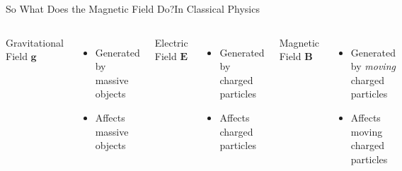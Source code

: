 \documentclass[12pt,aspectratio=169]{beamer}
\newcommand{\mb}[1]{\mathbf{#1}}
\begin{document}
\begin{frame}{So What Does the Magnetic Field Do?}{In Classical Physics}
  \begin{columns}
    \begin{center}
      Gravitational Field $\mb{g}$
    \end{center}
    \begin{itemize}
    \item Generated by massive objects
    \item Affects massive objects
    \end{itemize}

    \begin{center}
      Electric Field $\mb{E}$
    \end{center}
    \begin{itemize}
    \item Generated by charged particles
    \item Affects charged particles
    \end{itemize}

    \begin{center}
      Magnetic Field $\mb{B}$
    \end{center}
    \begin{itemize}
    \item Generated by \emph{moving} charged particles
    \item Affects moving charged particles
    \end{itemize}
  \end{columns}
\end{frame}
\end{document}
